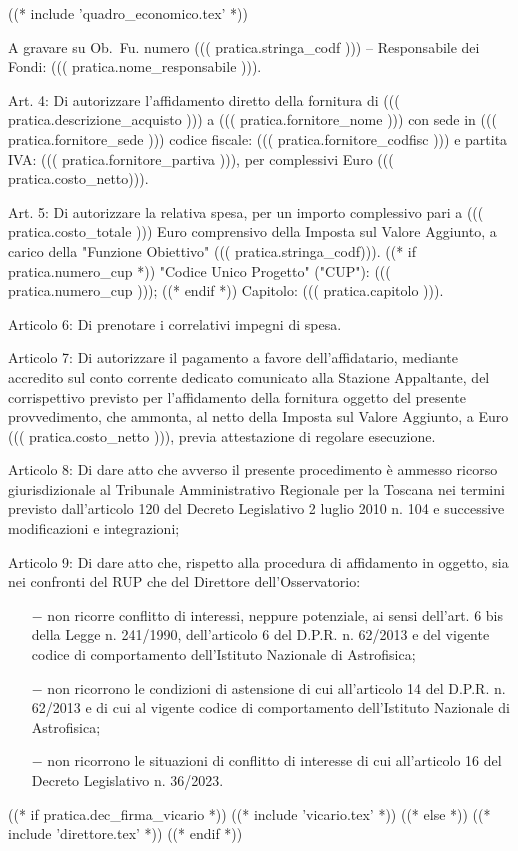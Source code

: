 ((* include 'quadro_economico.tex' *))

A gravare su Ob.~Fu. numero ((( pratica.stringa_codf ))) – Responsabile dei
Fondi: ((( pratica.nome_responsabile ))).

Art. 4: Di autorizzare l’affidamento diretto della fornitura di ((( pratica.descrizione_acquisto ))) a
((( pratica.fornitore_nome ))) con sede in  ((( pratica.fornitore_sede )))
codice fiscale: ((( pratica.fornitore_codfisc ))) e partita IVA:
((( pratica.fornitore_partiva ))), per complessivi Euro ((( pratica.costo_netto))).

Art. 5: Di autorizzare la relativa spesa, per un importo complessivo
pari a ((( pratica.costo_totale ))) Euro comprensivo della Imposta sul
Valore Aggiunto, a carico della "Funzione Obiettivo" ((( pratica.stringa_codf))).
((* if pratica.numero_cup *)) "Codice Unico Progetto" ("CUP"): ((( pratica.numero_cup ))); ((* endif *))
Capitolo: ((( pratica.capitolo ))).

Articolo 6: Di prenotare i correlativi impegni di spesa.

Articolo 7: Di autorizzare il pagamento a favore dell’affidatario,
mediante accredito sul conto corrente dedicato comunicato alla Stazione
Appaltante, del corrispettivo previsto per l’affidamento della
fornitura oggetto del presente provvedimento, che ammonta, al netto
della Imposta sul Valore Aggiunto, a Euro ((( pratica.costo_netto ))),
previa attestazione di regolare esecuzione.

Articolo 8: Di dare atto che avverso il presente procedimento è ammesso
ricorso giurisdizionale al Tribunale Amministrativo Regionale per la
Toscana nei termini previsto dall’articolo 120 del Decreto Legislativo
2 luglio 2010 n. 104 e successive modificazioni e integrazioni;

Articolo 9: Di dare atto che, rispetto alla procedura di affidamento in
oggetto, sia nei confronti del RUP che del Direttore dell’Osservatorio:

\begin{itemize}

\item[$-$]  non ricorre conflitto di interessi, neppure potenziale, ai
sensi dell’art. 6 bis della Legge n. 241/1990, dell’articolo 6 del
D.P.R. n. 62/2013 e del vigente codice di comportamento dell’Istituto
Nazionale di Astrofisica;

\item[$-$]  non ricorrono le condizioni di astensione di cui
all’articolo 14 del D.P.R. n. 62/2013 e di cui al vigente codice di
comportamento dell’Istituto Nazionale di Astrofisica;

\item[$-$] non ricorrono le situazioni di conflitto di interesse di cui
all’articolo 16 del Decreto Legislativo n. 36/2023.

\end{itemize}

((* if pratica.dec_firma_vicario *))
((* include 'vicario.tex' *))
((* else *))
((* include 'direttore.tex' *))
((* endif *))

